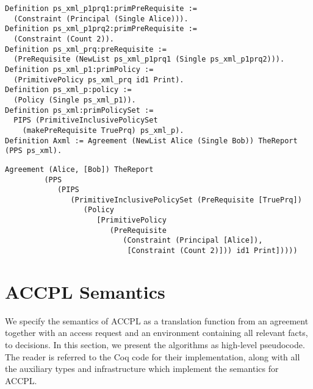 \documentclass[runningheads,a4paper]{llncs}
\begin{document}
\begin{lstlisting}
Definition ps_xml_p1prq1:primPreRequisite := 
  (Constraint (Principal (Single Alice))).
Definition ps_xml_p1prq2:primPreRequisite := 
  (Constraint (Count 2)).
Definition ps_xml_prq:preRequisite := 
  (PreRequisite (NewList ps_xml_p1prq1 (Single ps_xml_p1prq2))).
Definition ps_xml_p1:primPolicy := 
  (PrimitivePolicy ps_xml_prq id1 Print).
Definition ps_xml_p:policy := 
  (Policy (Single ps_xml_p1)).
Definition ps_xml:primPolicySet :=
  PIPS (PrimitiveInclusivePolicySet
    (makePreRequisite TruePrq) ps_xml_p).
Definition Axml := Agreement (NewList Alice (Single Bob)) TheReport (PPS ps_xml).
\end{lstlisting}

\begin{lstlisting}
Agreement (Alice, [Bob]) TheReport
         (PPS
            (PIPS
               (PrimitiveInclusivePolicySet (PreRequisite [TruePrq])
                  (Policy
                     [PrimitivePolicy
                        (PreRequisite
                           (Constraint (Principal [Alice]),
                            [Constraint (Count 2)])) id1 Print]))))

\end{lstlisting}

\section{ACCPL Semantics}
We specify the semantics of \ac{ACCPL} as a translation function from
an agreement together with an access request and an environment
containing all relevant facts, to decisions.  In this section, we
present the algorithms as high-level pseudocode.  The reader is
referred to the Coq code for their implementation, along with all the
auxiliary types and infrastructure which implement the semantics for
\ac{ACCPL}.
\end{document}
